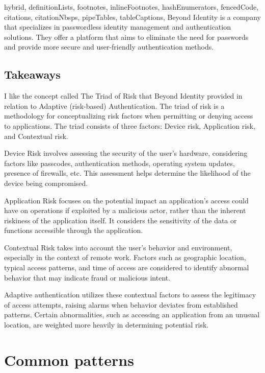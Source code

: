 \documentclass[
  digital,     %
  oneside,     %
  nosansbold,  %
  nocolorbold, %
  lof,         %
  lot,         %
]{fithesis4}
\begin{document}
\begin{markdown*}{%
  hybrid,
  definitionLists,
  footnotes,
  inlineFootnotes,
  hashEnumerators,
  fencedCode,
  citations,
  citationNbsps,
  pipeTables,
  tableCaptions,
}
Beyond Identity is a company that specializes in passwordless identity management and authentication solutions. They offer a platform that aims to eliminate the need for passwords and provide more secure and user-friendly authentication methods.

\subsection{Takeaways}
I like the concept called The Triad of Risk that Beyond Identity provided in relation to Adaptive (risk-based) Authentication.
The triad of risk is a methodology for conceptualizing risk factors when permitting or denying access to applications.
The triad consists of three factors: Device risk, Application risk, and Contextual risk.

Device Risk involves assessing the security of the user's hardware, considering factors like passcodes, authentication methods, operating system updates, presence of firewalls, etc.
This assessment helps determine the likelihood of the device being compromised.

Application Risk focuses on the potential impact an application's access could have on operations if exploited by a malicious actor, rather than the inherent riskiness of the application itself.
It considers the sensitivity of the data or functions accessible through the application.

Contextual Risk takes into account the user's behavior and environment, especially in the context of remote work. Factors such as geographic location, typical access patterns, and time of access are considered to identify abnormal behavior that may indicate fraud or malicious intent.

Adaptive authentication utilizes these contextual factors to assess the legitimacy of access attempts, raising alarms when behavior deviates from established patterns.
Certain abnormalities, such as accessing an application from an unusual location, are weighted more heavily in determining potential risk.\cite{existing-beyond-identity}



\newpage
\section{Common patterns}


\end{markdown*}
\end{document}
